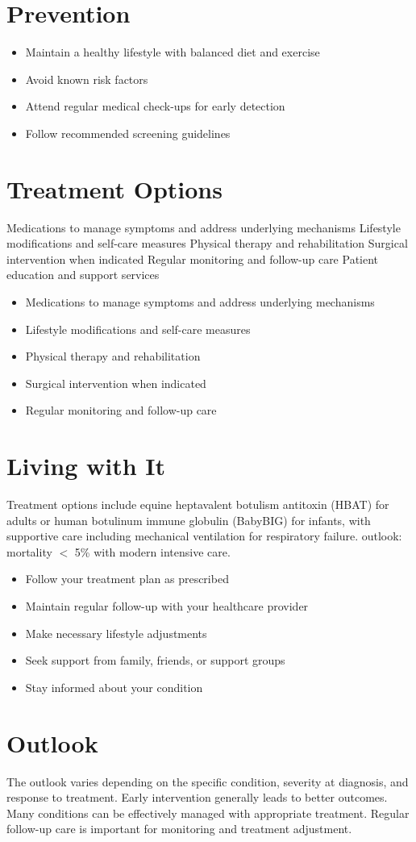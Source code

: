 \section{Prevention}
\begin{itemize}[noitemsep]
  \item Maintain a healthy lifestyle with balanced diet and exercise
  \item Avoid known risk factors
  \item Attend regular medical check-ups for early detection
  \item Follow recommended screening guidelines
\end{itemize}
\section{Treatment Options}
Medications to manage symptoms and address underlying mechanisms Lifestyle modifications and self-care measures Physical therapy and rehabilitation Surgical intervention when indicated Regular monitoring and follow-up care Patient education and support services

\begin{itemize}[noitemsep]
  \item Medications to manage symptoms and address underlying mechanisms
  \item Lifestyle modifications and self-care measures
  \item Physical therapy and rehabilitation
  \item Surgical intervention when indicated
  \item Regular monitoring and follow-up care
\end{itemize}
\section{Living with It}
Treatment options include equine heptavalent botulism antitoxin (HBAT) for adults or human botulinum immune globulin (BabyBIG) for infants, with supportive care including mechanical ventilation for respiratory failure. outlook: mortality $<$ 5\% with modern intensive care.

\begin{itemize}[noitemsep]
  \item Follow your treatment plan as prescribed
  \item Maintain regular follow-up with your healthcare provider
  \item Make necessary lifestyle adjustments
  \item Seek support from family, friends, or support groups
  \item Stay informed about your condition
\end{itemize}
\section{Outlook}
The outlook varies depending on the specific condition, severity at diagnosis, and response to treatment. Early intervention generally leads to better outcomes. Many conditions can be effectively managed with appropriate treatment. Regular follow-up care is important for monitoring and treatment adjustment.
